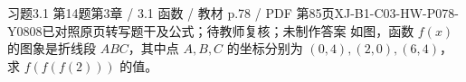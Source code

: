 \par\noindent\begin{minipage}{\linewidth}
\begin{bankitem}{习题3.1 第14题}{第3章 / 3.1 函数 / 教材 p.78 / PDF 第85页}{XJ-B1-C03-HW-P078-Y0808}{已对照原页转写题干及公式；待教师复核；未制作答案}
如图，函数 $f(x)$ 的图象是折线段 $ABC$，其中点 $A,B,C$ 的坐标分别为 $(0,4),(2,0),(6,4)$，求 $f(f(f(2)))$ 的值。
\end{bankitem}
\end{minipage}\par\medskip
